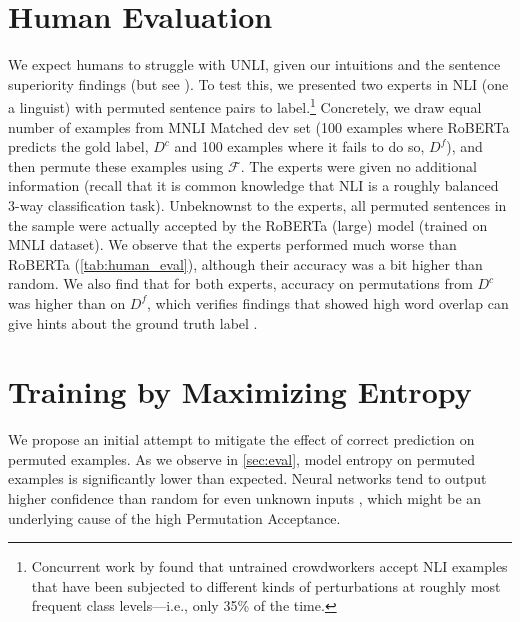 \documentclass[11pt,a4paper]{article}
\newcommand{\PermAcc}{Permutation Acceptance} %
\begin{document}

\section{Human Evaluation}
\label{sec:human_eval}

We expect humans to struggle with UNLI, given our intuitions and the sentence superiority findings (but see \citealt{mollica-2020-composition}). To test this, we presented two experts in NLI (one a linguist) with permuted sentence pairs to label.\footnote{Concurrent work by  found that untrained crowdworkers accept NLI examples that have been subjected to different kinds of perturbations at roughly most frequent class levels---i.e., only 35\% of the time.} Concretely, we draw equal number of examples from MNLI Matched dev set (100 examples where RoBERTa predicts the gold label, $D^c$ and 100 examples where it fails to do so, $D^f$), and then permute these examples using $\mathcal{F}$. The experts were given no additional information (recall that it is common knowledge that NLI is a roughly balanced 3-way classification task). Unbeknownst to the experts, all permuted sentences in the sample were actually accepted by the RoBERTa (large) model (trained on MNLI dataset). We observe that the experts performed much worse than RoBERTa (\autoref{tab:human_eval}), although their accuracy was a bit higher than random. We also find that for both experts, accuracy on permutations from $D^c$ was higher than on $D^f$, which verifies findings that showed high word overlap can give hints about the ground truth label \citep{dasgupta-etal-2018-evaluating, poliak-etal-2018-hypothesis, gururangan-etal-2018-annotation, naik-etal-2019-exploring}.



\section{Training by Maximizing Entropy}
\label{sec:training}

We propose an initial attempt to mitigate the effect of correct prediction on permuted examples. As we observe in \autoref{sec:eval}, model entropy on permuted examples is significantly lower than expected. 
Neural networks tend to output higher confidence than random for even unknown inputs \cite{gandhi2019mutual}, which might be an underlying cause of the high \PermAcc.
\end{document}
